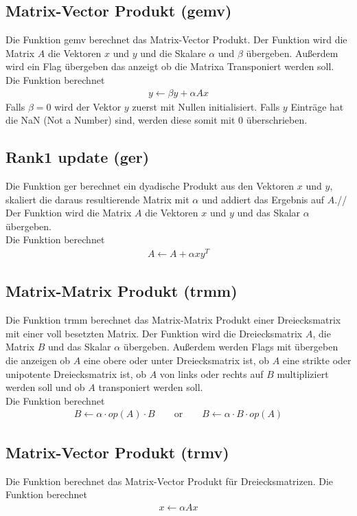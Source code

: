 \subsection{Matrix-Vector Produkt (gemv)}
Die Funktion \glqq gemv \flqq berechnet das Matrix-Vector Produkt.
Der Funktion wird die Matrix $A$ die Vektoren $x$ und $y$ und die Skalare $\alpha$ und $\beta$ übergeben. Außerdem wird ein Flag übergeben das anzeigt ob die Matrixa Transponiert werden soll.\\
Die Funktion berechnet
\begin{align}
	y \leftarrow \beta  y + \alpha A x 
\end{align}
Falls $\beta = 0$ wird der Vektor $y$ zuerst mit Nullen initialisiert. Falls $y$ Einträge hat die NaN (Not a Number) sind, werden diese somit mit 0 überschrieben.
\subsection{Rank1 update (ger)}
Die Funktion \glqq ger \flqq berechnet ein dyadische Produkt aus den Vektoren $x$ und $y$, skaliert die daraus resultierende Matrix mit $\alpha$ und addiert das Ergebnis auf $A$.//
Der Funktion wird die Matrix $A$ die Vektoren $x$ und $y$ und das Skalar $\alpha$ übergeben.\\
Die Funktion berechnet
\begin{align}
	A \leftarrow A + \alpha  x y^T
\end{align}

\subsection{Matrix-Matrix Produkt (trmm)}
Die Funktion \glqq trmm \flqq berechnet das Matrix-Matrix Produkt einer Dreiecksmatrix mit einer voll besetzten Matrix.
Der Funktion wird die Dreiecksmatrix $A$, die Matrix $B$ und das Skalar $\alpha$ übergeben. Außerdem werden Flags mit übergeben die anzeigen ob $A$ eine obere oder unter Dreiecksmatrix ist, ob $A$ eine strikte oder unipotente Dreiecksmatrix ist, ob $A$ von links oder rechts auf $B$ multipliziert werden soll und ob $A$ transponiert werden soll.
\\
Die Funktion berechnet
\begin{align}
B \leftarrow  \alpha \cdot op(A) \cdot B \qquad \text{or} \qquad B \leftarrow  \alpha \cdot B \cdot op(A)
\end{align}
\subsection{Matrix-Vector Produkt (trmv)}
Die Funktion berechnet das Matrix-Vector Produkt für Dreiecksmatrizen.
Die Funktion berechnet
\begin{align}
x \leftarrow \alpha  Ax %
\end{align}

